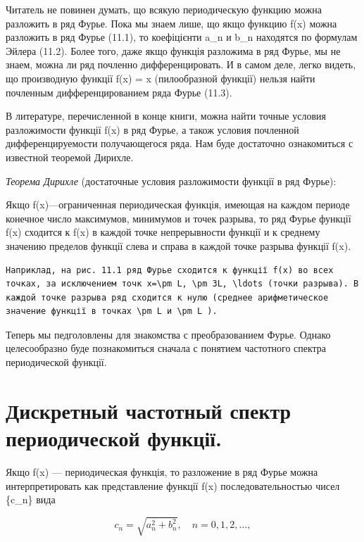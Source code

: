 \documentclass[
]{article}
\begin{document}
Читатель не повинен думать, що всякую периодическую функцию можна
разложить в ряд Фурье. Пока мы знаем лише, що якщо функцию f(x) можна
разложить в ряд Фурье (11.1), то коефіцієнти a\_n и b\_n находятся по
формулам Эйлера (11.2). Более того, даже якщо функція разложима в ряд
Фурье, мы не знаем, можна ли ряд почленно дифференцировать. И в самом
деле, легко видеть, що производную функції f(x) = x (пилообразной
функції) нельзя найти почленным дифференцированием ряда Фурье (11.3).

В литературе, перечисленной в конце книги, можна найти точные условия
разложимости функції f(x) в ряд Фурье, а також условия почленной
дифференцируемости получающегося ряда. Нам буде достаточно ознакомиться
с известной теоремой Дирихле.

\emph{Теорема Дирихле} (достаточные условия разложимости функції в ряд
Фурье):

Якщо f(x)---ограниченная периодическая функція, имеющая на каждом
периоде конечное число максимумов, минимумов и точек разрыва, то ряд
Фурье функції f(x) сходится к f(x) в каждой точке непрерывности функції
и к среднему значению пределов функції слева и справа в каждой точке
разрыва функції f(x).

\begin{verbatim}
Наприклад, на рис. 11.1 ряд Фурье сходится к функції f(x) во всех точках, за исключением точк x=\pm L, \pm 3L, \ldots (точки разрыва). В каждой точке разрыва ряд сходится к нулю (среднее арифметическое значение функції в точках \pm L и \pm L ).
\end{verbatim}

Теперь мы педголовлены для знакомства с преобразованием Фурье. Однако
целесообразно буде познакомиться сначала с понятием частотного спектра
периодической функції.

\section{Дискретный частотный спектр периодической
функції.}\label{ux434ux438ux441ux43aux440ux435ux442ux43dux44bux439-ux447ux430ux441ux442ux43eux442ux43dux44bux439-ux441ux43fux435ux43aux442ux440-ux43fux435ux440ux438ux43eux434ux438ux447ux435ux441ux43aux43eux439-ux444ux443ux43dux43aux446ux456ux457.}

Якщо f(x) --- периодическая функція, то разложение в ряд Фурье можна
интерпретировать как представление функції f(x) последовательностью
чисел \{c\_n\} вида

\[
c_n = \sqrt{a_n^2 + b_n^2}, \quad n = 0, 1, 2, \dots,
\]
\end{document}
